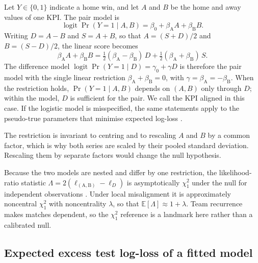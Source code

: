 Let $Y\in\{0,1\}$ indicate a home win, and let $A$ and $B$ be the home and away values of one KPI.
The pair model is
\begin{equation}
  \operatorname{logit}\Pr(Y=1\mid A,B)=\beta_{0}+\beta_{\mathrm{A}}A+\beta_{\mathrm{B}}B .
  \label{eq:si_pair}
\end{equation}
Writing $D=A-B$ and $S=A+B$, so that $A=(S+D)/2$ and $B=(S-D)/2$, the linear score becomes
\begin{equation}
  \beta_{\mathrm{A}}A+\beta_{\mathrm{B}}B
  =\tfrac12(\beta_{\mathrm{A}}-\beta_{\mathrm{B}})\,D
  +\tfrac12(\beta_{\mathrm{A}}+\beta_{\mathrm{B}})\,S .
  \label{eq:si_rotation}
\end{equation}
The difference model $\operatorname{logit}\Pr(Y=1\mid D)=\gamma_{0}+\gamma D$ is therefore the pair model with the single linear restriction $\beta_{\mathrm{A}}+\beta_{\mathrm{B}}=0$, with $\gamma=\beta_{\mathrm{A}}=-\beta_{\mathrm{B}}$.
When the restriction holds, $\Pr(Y=1\mid A,B)$ depends on $(A,B)$ only through $D$; within the model, $D$ is sufficient for the pair.
We call the KPI aligned in this case.
If the logistic model is misspecified, the same statements apply to the pseudo-true parameters that minimise expected log-loss \parencite{white1982}.

The restriction is invariant to centring and to rescaling $A$ and $B$ by a common factor, which is why both series are scaled by their pooled standard deviation.
Rescaling them by separate factors would change the null hypothesis.

Because the two models are nested and differ by one restriction, the likelihood-ratio statistic $\Lambda=2(\ell_{(\mathrm{A},\mathrm{B})}-\ell_{D})$ is asymptotically $\chi^{2}_{1}$ under the null for independent observations \parencite{wilks1938}.
Under local misalignment it is approximately noncentral $\chi^{2}_{1}$ with noncentrality $\lambda$, so that $\mathbb{E}[\Lambda]\approx 1+\lambda$.
Team recurrence makes matches dependent, so the $\chi^{2}_{1}$ reference is a landmark here rather than a calibrated null.

\subsection*{Expected excess test log-loss of a fitted model}

